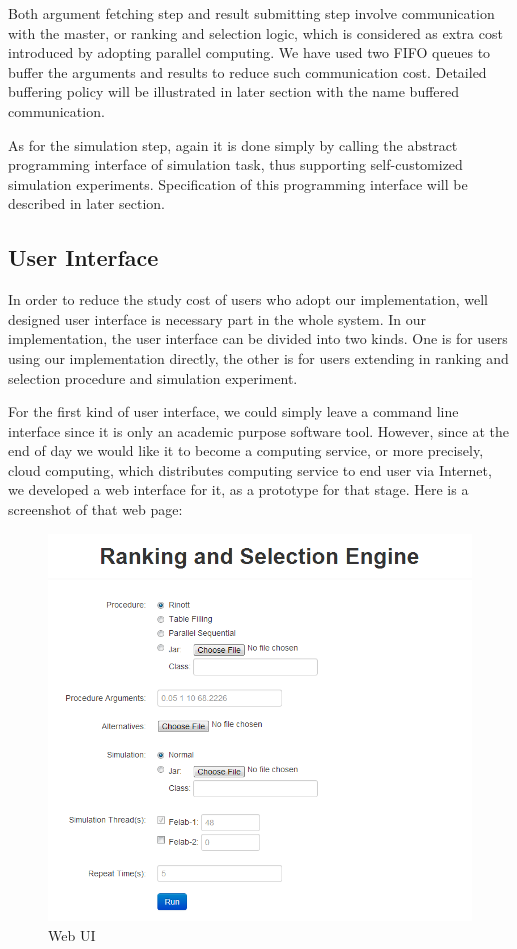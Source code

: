 \documentclass[12pt,a4paper]{report}
\begin{document}
Both argument fetching step and result submitting step involve communication with the master, or ranking and selection logic, which is considered as extra cost introduced by adopting parallel computing. We have used two FIFO queues to buffer the arguments and results to reduce such communication cost. Detailed buffering policy will be illustrated in later section with the name buffered communication.

As for the simulation step, again it is done simply by calling the abstract programming interface of simulation task, thus supporting self-customized simulation experiments. Specification of this programming interface will be described in later section.

\subsection{User Interface}

In order to reduce the study cost of users who adopt our implementation, well designed user interface is necessary part in the whole system. In our implementation, the user interface can be divided into two kinds. One is for users using our implementation directly, the other is for users extending in ranking and selection procedure and simulation experiment.

For the first kind of user interface, we could simply leave a command line interface since it is only an academic purpose software tool. However, since at the end of day we would like it to become a computing service, or more precisely, cloud computing, which distributes computing service to end user via Internet, we developed a web interface for it, as a prototype for that stage. Here is a screenshot of that web page:

\begin{figure}[ht]\label{web-ui}
\centering
\includegraphics[width=120mm]{rase_web.png}
\caption{Web UI}
\end{figure}
\end{document}

